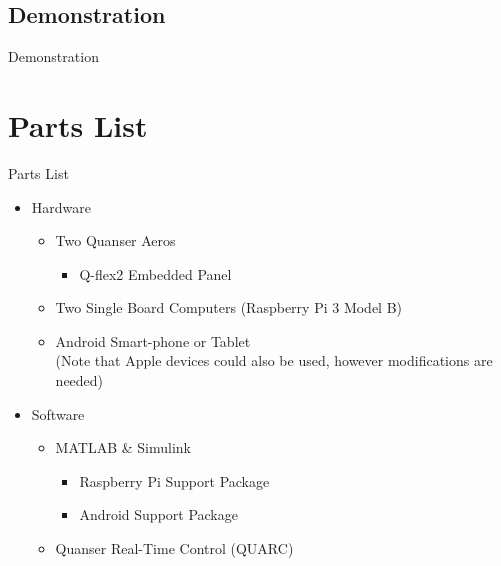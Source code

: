 \documentclass{beamer}
\begin{document}

\subsection{Demonstration}

\begin{frame}{Demonstration} %
    \centering
\end{frame}


\section{Parts List}

\begin{frame}{Parts List}{} %

  \begin{itemize}
      \item Hardware
      \begin{itemize}
        \item Two Quanser Aeros
            \begin{itemize}
                \item Q-flex2 Embedded Panel
            \end{itemize}
        \item Two Single Board Computers (Raspberry Pi 3 Model B)
        \item Android Smart-phone or Tablet\\
        (Note that Apple devices could also be used, however modifications are needed)
      \end{itemize}
      \item Software
      \begin{itemize}
          \item MATLAB \& Simulink
          \begin{itemize}
            \item Raspberry Pi Support Package
            \item Android Support Package
          \end{itemize}
          \item Quanser Real-Time Control (QUARC)
      \end{itemize}
  \end{itemize}
\end{frame}
\end{document}
